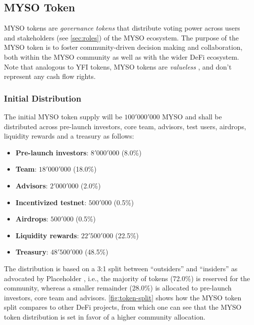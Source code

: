 \documentclass[a4paper]{article}
\begin{document}
\subsection{MYSO Token}
MYSO tokens are \emph{governance tokens} that distribute voting power across users and stakeholders (see \cref{sec:roles}) of the MYSO ecosystem. The purpose of the MYSO token is to foster community-driven decision making and collaboration, both within the MYSO community as well as with the wider DeFi ecosystem. Note that analogous to YFI tokens, MYSO tokens are \emph{valueless} \cite{yearn}, and don't represent any cash flow rights.

\subsubsection{Initial Distribution}
The initial MYSO token supply will be $100'000'000$ MYSO and shall be distributed across pre-launch investors, core team, advisors, test users, airdrops, liquidity rewards and a treasury as follows:
\begin{itemize}
    \item \textbf{Pre-launch investors}: $8'000'000$ (8.0\%)
    \item \textbf{Team}: $18'000'000$ (18.0\%)
    \item \textbf{Advisors}: $2'000'000$ (2.0\%)
    \item \textbf{Incentivized testnet}: $500'000$ (0.5\%)
    \item \textbf{Airdrops}: $500'000$ (0.5\%)
    \item \textbf{Liquidity rewards}: $22'500'000$ (22.5\%)
    \item \textbf{Treasury}: $48'500'000$ (48.5\%)
\end{itemize}
The distribution is based on a 3:1 split between ``outsiders'' and ``insiders'' as advocated by Placeholder \cite{placeholder}, i.e., the majority of tokens (72.0\%) is reserved for the community, whereas a smaller remainder (28.0\%) is allocated to pre-launch investors, core team and advisors. \cref{fig:token-split} shows how the MYSO token split compares to other DeFi projects, from which one can see that the MYSO token distribution is set in favor of a higher community allocation.
\end{document}

